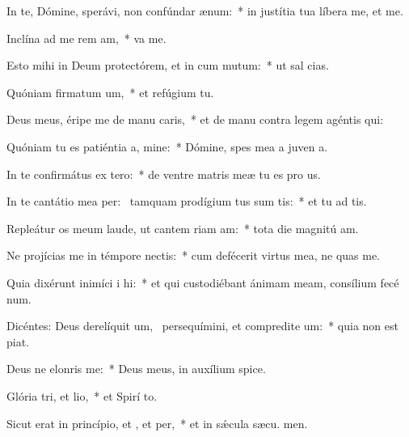 \item In te, Dómine, sperávi, non confúndar  ænum:~* in justítia tua líbera me, et  me.
\item Inclína ad me rem am,~*  va me.
\item Esto mihi in Deum protectórem, et in cum mutum:~* ut sal  cias.
\item Quóniam firmatum um,~* et refúgium   tu.
\item Deus meus, éripe me de manu caris,~* et de manu contra legem agéntis  qui:
\item Quóniam tu es patiéntia a, mine:~* Dómine, spes mea a juven a.
\item In te confirmátus  ex tero:~* de ventre matris meæ tu es pro us.
\item In te cantátio mea per:~\pscross{} tamquam prodígium tus sum tis:~* et tu ad tis.
\item Repleátur os meum laude, ut cantem riam am:~* tota die magnitú am.
\item Ne projícias me in témpore nectis:~* cum defécerit virtus mea, ne quas me.
\item Quia dixérunt inimíci i hi:~* et qui custodiébant ánimam meam, consílium fecé  num.
\item Dicéntes: Deus derelíquit um,~\pscross{} persequímini, et compredite um:~* quia non est  piat.
\item Deus ne elonris  me:~* Deus meus, in auxílium  spice.
\item Glória tri, et lio,~* et Spirí to.
\item Sicut erat in princípio, et , et per,~* et in sǽcula sæcu. men.
